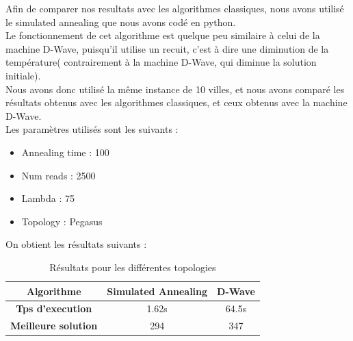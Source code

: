 \documentclass{article}
\begin{document}
        Afin de comparer nos resultats avec les algorithmes classiques, nous avons utilisé le simulated annealing que nous avons codé en python.\\
        Le fonctionnement de cet algorithme est quelque peu similaire à celui de la machine D-Wave, puisqu'il utilise un recuit, c'est à dire une diminution de la température( contrairement à la machine D-Wave, qui diminue la solution initiale).\\
        Nous avons donc utilisé la même instance de 10 villes, et nous avons comparé les résultats obtenus avec les algorithmes classiques, et ceux obtenus avec la machine D-Wave.\\
        Les paramètres utilisés sont les suivants : \\
        \begin{itemize}
            \item Annealing time : 100
            \item Num reads : 2500
            \item Lambda : 75
            \item Topology : Pegasus
        \end{itemize}
        On obtient les résultats suivants :\\
        \begin{table}[h]
            \centering
            \begin{tabular}{|c|c|c|}
                \hline
                \textbf{Algorithme} & Simulated Annealing & D-Wave  \\ \hline
                \textbf{Tps d'execution} & 1.62s & 64.5s  \\ \hline
                \textbf{Meilleure solution} & 294 & 347 \\ \hline
            \end{tabular}
            \caption{Résultats pour les différentes topologies}
            \label{tab:algo_results}
        \end{table}\\
\end{document}
